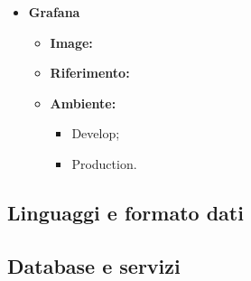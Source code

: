 \begin{itemize}
  \item \textbf{Grafana} 
    \begin{itemize}
      \item \textbf{Image:}
      \item \textbf{Riferimento:}
      \item \textbf{Ambiente:}
        \begin{itemize}
          \item Develop;
          \item Production.
        \end{itemize}
    \end{itemize}
\end{itemize}

\subsection{Linguaggi e formato dati}






\subsection{Database e servizi}







